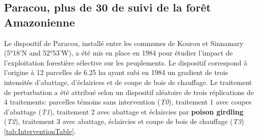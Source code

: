 \documentclass[
  11pt,
  french,
  A4paper,
  extrafontsizes,onecolumn,openright
  ]{memoir}
\begin{document}
\subsection{Paracou, plus de 30 de suivi de la forêt
Amazonienne}\label{paracou-plus-de-30-de-suivi-de-la-foret-amazonienne}

Le dispositif de Paracou, installé entre les communes de Kourou et
Sinnamary (5°18'N and 52°53'W), a été mis en place en 1984 pour étudier
l'impact de l'exploitation forestière sélective sur les peuplements. Le
dispositif correspond à l'origine à 12 parcelles de 6.25 ha ayant subi
en 1984 un gradient de trois intensités d'abattage, d'éclairices et de
coupe de bois de chauffage. Le traitement de perturbation a été attribué
selon un dispositif aléatoire de trois réplications de 4 traitements:
parcelles témoins sans intervention (\emph{T0}), traitement 1 avec
coupes d'abattage (\emph{T1}), traitement 2 avec abattage et éclaircies
par \textbf{poison girdling} (\emph{T2}), traitement 3 avec abattage,
éclaircies et coupe de bois de chauffage (\emph{T3})
\ref{tab:InterventionTable}.
\end{document}
